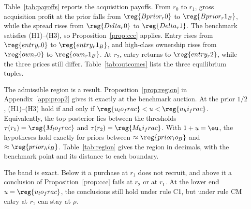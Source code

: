 Table~\ref{tab:payoffs} reports the acquisition payoffs. From \(r_0\) to \(r_1\), gross acquisition profit at the
prior falls from \(\reg{Bprior_r0}\) to \(\reg{Bprior_r1_B}\), while the spread rises from \(\reg{Delta_r0}\) to
\(\reg{Delta_r1}\). The benchmark satisfies (H1)--(H3), so Proposition~\ref{prop:ccc} applies. Entry rises from
\(\reg{entry_r0}\) to \(\reg{entry_r1_B}\), and high-class ownership rises from \(\reg{own_r0}\) to
\(\reg{own_r1_B}\). At \(r_2\), entry returns to \(\reg{entry_r2}\), while the three prices still differ.
Table~\ref{tab:outcomes} lists the three equilibrium tuples.

The admissible region is a result. Proposition~\ref{prop:region} in Appendix~\ref{app:prop2} gives it exactly at the
benchmark auction. At the prior \(1/2\), (H1)--(H3) hold if and only if \(\reg{u_lo_frac}<u<\reg{u_hi_frac}\).
Equivalently, the top posterior lies between the thresholds \(\tau(r_1)=\reg{M_lo_frac}\) and
\(\tau(r_2)=\reg{M_hi_frac}\). With \(1+u=\eu\), the hypotheses hold exactly for priors between
\(\approx\reg{prior_lo_B}\) and \(\approx\reg{prior_hi_B}\). Table~\ref{tab:region} gives the region in decimals, with
the benchmark point and its distance to each boundary.

The band is exact. Below it a purchase at \(r_1\) does not recruit, and above it a conclusion of
Proposition~\ref{prop:ccc} fails at \(r_2\) or at \(r_1\). At the lower end \(u=\reg{u_lo_frac}\), the conclusions
still hold under rule C1, but under rule CM entry at \(r_1\) can stay at \(\rho\).

